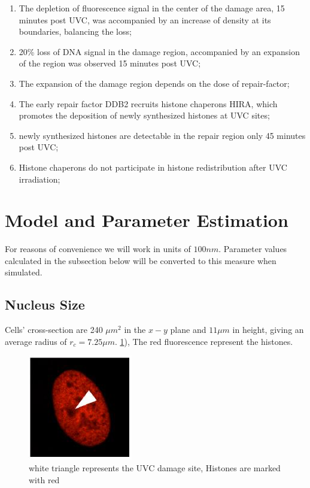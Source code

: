 \documentclass[12pt]{report}
\begin{document}
\begin{enumerate}
		\item The depletion of fluorescence signal in the center of the damage area, 15 minutes post UVC, was accompanied by an increase of density at its boundaries, balancing the loss;
		\item 20\% loss of DNA signal in the damage region, accompanied by an expansion of the region was observed 15 minutes post UVC;
		\item The expansion of the damage region depends on the dose of repair-factor;		
		\item The early repair factor DDB2 recruits histone chaperons HIRA, which promotes the deposition of newly synthesized histones at UVC sites;
		\item newly synthesized histones are detectable in the repair region only 45 minutes post UVC;
		\item Histone chaperons do not participate in histone redistribution after UVC irradiation;
		
	\end{enumerate}
	
	\section{Model and Parameter Estimation}
	For reasons of convenience we will work in units of $100 nm$. Parameter values calculated in the subsection below will be converted to this measure when simulated. 
	
	\subsection{Nucleus Size}
	 Cells' cross-section are 240 $\mu m^2$ in the $x-y$ plane and $11 \mu m$ in height, giving an average radius of $r_c=7.25 \mu m$.  \ref{fig:histoneMarkBeforeDamage}), The red fluorescence represent the histones.
		\begin{figure}[H]
			\centering
			\includegraphics[width=0.2\linewidth]{../histoneMarkBeforeDamage}
			\caption{white triangle represents the UVC damage site, Histones are marked with red}
			\label{fig:histoneMarkBeforeDamage}
		\end{figure}
		
\end{document}
